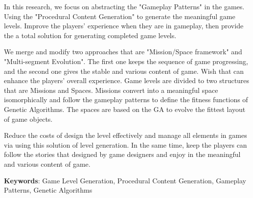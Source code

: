 In this research, we focus on abstracting the "Gameplay Patterns" in the games. Using the "Procedural Content Generation" to generate the meaningful game levels. Improve the players' experience when they are in gameplay, then provide the a total solution for generating completed game levels.

We merge and modify two approaches that are "Mission/Space framework" and "Multi-segment Evolution". The first one keeps the sequence of game progressing, and the second one gives the stable and various content of game. Wish that can enhance the players' overall experience. Game levels are divided to two structures that are Missions and Spaces. Missions convert into a meaningful space isomorphically and follow the gameplay patterns to define the fitness functions of Genetic Algorithms. The spaces are based on the GA to evolve the fittest layout of game objects.

Reduce the costs of design the level effectively and manage all elements in games via using this solution of level generation. In the same time, keep the players can follow the stories that designed by game designers and enjoy in the meaningful and various content of game.

\textbf{Keywords}: Game Level Generation, Procedural Content Generation, Gameplay Patterns, Genetic Algorithms